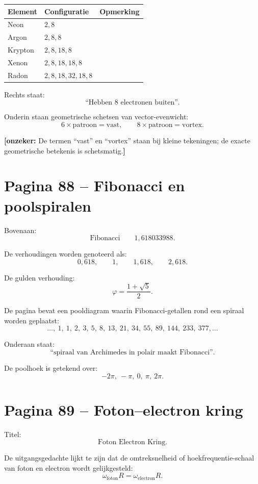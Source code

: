 \documentclass[11pt,a4paper]{article}
\newcommand{\onzeker}[1]{\ifmmode\text{\color{red!70!black}\bfseries[onzeker]}\else\textcolor{red!70!black}{\textbf{[onzeker:} #1\textbf{]}}\fi}
\begin{document}
\begin{center}
\begin{tabular}{lll}
\toprule
Element & Configuratie & Opmerking\\
\midrule
Neon & $2,8$ & \\
Argon & $2,8,8$ & \\
Krypton & $2,8,18,8$ & \\
Xenon & $2,8,18,18,8$ & \\
Radon & $2,8,18,32,18,8$ & \\
\bottomrule
\end{tabular}
\end{center}

Rechts staat:
\[
\text{``Hebben 8 electronen buiten''}.
\]

Onderin staan geometrische schetsen van vector-evenwicht:
\[
6\times \text{patroon} = \text{vast},\qquad
8\times \text{patroon} = \text{vortex}.
\]

\onzeker{De termen ``vast'' en ``vortex'' staan bij kleine tekeningen; de exacte geometrische betekenis is schetsmatig.}

\section*{Pagina 88 -- Fibonacci en poolspiralen}

Bovenaan:
\[
\text{Fibonacci}\qquad 1{,}618033988.
\]

De verhoudingen worden genoteerd als:
\[
0{,}618,\qquad 1,\qquad 1{,}618,\qquad 2{,}618.
\]

De gulden verhouding:
\[
\varphi=\frac{1+\sqrt{5}}{2}.
\]

De pagina bevat een pooldiagram waarin Fibonacci-getallen rond een spiraal worden geplaatst:
\[
\ldots,\ 1,\ 1,\ 2,\ 3,\ 5,\ 8,\ 13,\ 21,\ 34,\ 55,\ 89,\ 144,\ 233,\ 377,\ldots
\]

Onderaan staat:
\[
\text{``spiraal van Archimedes in polair maakt Fibonacci''}.
\]

De poolhoek is getekend over:
\[
-2\pi,\ -\pi,\ 0,\ \pi,\ 2\pi.
\]

\section*{Pagina 89 -- Foton--electron kring}

Titel:
\[
\text{Foton Electron Kring}.
\]

De uitgangsgedachte lijkt te zijn dat de omtreksnelheid of hoekfrequentie-schaal van foton en electron wordt gelijkgesteld:
\[
\omega_{\mathrm{foton}}R
=
\omega_{\mathrm{electron}}R.
\]
\end{document}
